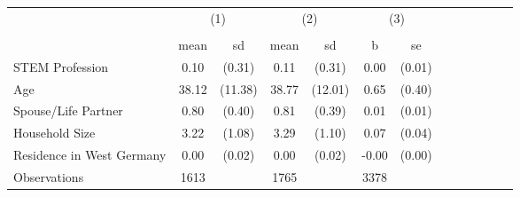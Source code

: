 {
\def\sym#1{\ifmmode^{#1}\else\(^{#1}\)\fi}
\begin{tabular}{l*{3}{cccc}}
\toprule
                    &\multicolumn{2}{c}{(1)}  &\multicolumn{2}{c}{(2)}  &\multicolumn{2}{c}{(3)}           \\
                    &\multicolumn{2}{c}{}     &\multicolumn{2}{c}{}     &\multicolumn{2}{c}{}              \\
                    &        mean&          sd&        mean&          sd&           b         &          se\\
\midrule
STEM Profession     &        0.10&      (0.31)&        0.11&      (0.31)&        0.00         &      (0.01)\\
Age                 &       38.12&     (11.38)&       38.77&     (12.01)&        0.65         &      (0.40)\\
Spouse/Life Partner &        0.80&      (0.40)&        0.81&      (0.39)&        0.01         &      (0.01)\\
Household Size      &        3.22&      (1.08)&        3.29&      (1.10)&        0.07         &      (0.04)\\
Residence in West Germany&        0.00&      (0.02)&        0.00&      (0.02)&       -0.00         &      (0.00)\\
\midrule
Observations        &        1613&            &        1765&            &        3378         &            \\
\bottomrule
\end{tabular}
}
